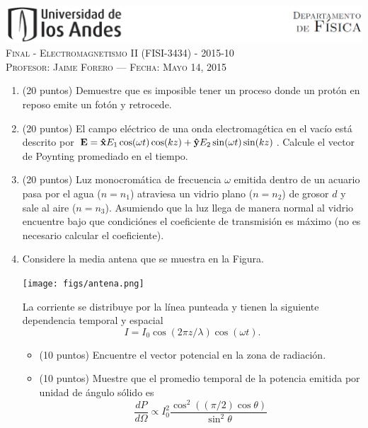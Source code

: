\documentclass[letterpaper,10pt,onecolumn]{article}
\begin{document}
\thispagestyle{empty}
\begin{center}

\includegraphics[width=490pt]{figs/header.png}\\[0.5cm]

\textsc{\LARGE Final - Electromagnetismo II (FISI-3434) - 2015-10}\\[0.5cm]

\textsc{\Large{Profesor: Jaime Forero --- Fecha: Mayo 14, 2015}} \\[0.5cm]
\end{center}

\begin{enumerate}

\item (20 puntos)
 Demuestre que es imposible tener un proceso donde un  prot\'on en
 reposo emite un fot\'on y retrocede.

\item (20 puntos) El campo el\'ectrico de una onda electromag\'etica
  en el vac\'io est\'a descrito por ${\bf E}={\bf \hat{x}} E_1 \cos(\omega t)
  \cos(kz) + {\bf \hat{y}} E_2 \sin(\omega t)
  \sin(kz)$. Calcule el vector de Poynting promediado en el
  tiempo.



\item (20 puntos) 
Luz monocrom\'atica de frecuencia $\omega$ emitida dentro de un acuario pasa por
el agua ($n=n_1$) atraviesa un vidrio plano ($n=n_2$)  de grosor $d$ y
sale al aire ($n=n_3$).  Asumiendo que la luz llega de manera normal al
vidrio encuentre bajo que condici\'ones el coeficiente de
transmisi\'on es m\'aximo (no es necesario calcular el coeficiente). 

\item
Considere la media antena que se muestra en la Figura. 
\begin{center}
\texttt{[image: figs/antena.png]}
\end{center}
La corriente se
distribuye por la l\'inea punteada y tienen la siguiente dependencia
temporal y espacial
\begin{displaymath}
I=I_0 \cos(2\pi z/\lambda)\cos(\omega t).
\end{displaymath} 
\begin{itemize}
\item (10 puntos) Encuentre el vector potencial en la zona de radiaci\'on.
\item (10 puntos) Muestre que el promedio temporal de la potencia emitida por
  unidad de \'angulo s\'olido es 
\begin{displaymath}
\frac{dP}{d\Omega} \propto
I_0^2\frac{\cos^{2}((\pi/2)\cos\theta)}{\sin^2{\theta}} 
\end{displaymath}
\end{itemize}


\end{enumerate}
\end{document}
